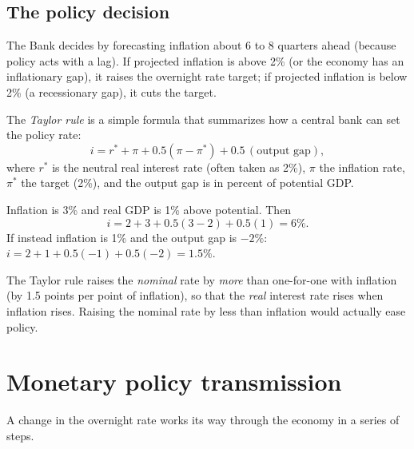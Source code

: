 \subsection{The policy decision}

The Bank decides by forecasting inflation about 6 to 8 quarters ahead (because policy acts
with a lag). If projected inflation is above 2\% (or the economy has an inflationary
gap), it raises the overnight rate target; if projected inflation is below 2\% (a
recessionary gap), it cuts the target.

\begin{definition}
The \emph{Taylor rule} is a simple formula that summarizes how a central bank can set the
policy rate:
\[
  i = r^{*} + \pi + 0.5(\pi - \pi^{*}) + 0.5\,(\text{output gap}),
\]
where $r^{*}$ is the neutral real interest rate (often taken as 2\%), $\pi$ the inflation
rate, $\pi^{*}$ the target (2\%), and the output gap is in percent of potential GDP.
\end{definition}

\begin{example}
Inflation is 3\% and real GDP is 1\% above potential. Then
\[
  i = 2 + 3 + 0.5(3 - 2) + 0.5(1) = 6\%.
\]
If instead inflation is 1\% and the output gap is $-2\%$:
$i = 2 + 1 + 0.5(-1) + 0.5(-2) = 1.5\%$.
\end{example}

\begin{important}[Pitfall]
The Taylor rule raises the \emph{nominal} rate by \emph{more} than one-for-one with
inflation (by 1.5 points per point of inflation), so that the \emph{real} interest rate
rises when inflation rises. Raising the nominal rate by less than inflation would actually
ease policy.
\end{important}

\section{Monetary policy transmission}

A change in the overnight rate works its way through the economy in a series of steps.

\begin{center}
\end{center}

